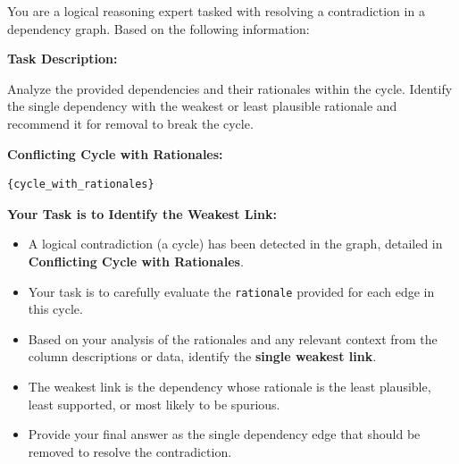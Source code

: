 \begin{tcolorbox}[
    float*=t, width=\textwidth, floatplacement=htbp,
    colback=green!10!white,  %
    colframe=green!60!black, %
    title={Prompt for Cycle Resolution in Dependency Discovery ($\pi_\mathtt{resolve}$)}, %
    fonttitle=\bfseries\color{white}, %
    arc=2mm, %
    boxrule=1pt %
]
\small %

You are a logical reasoning expert tasked with resolving a contradiction in a dependency graph. Based on the following information:

\vspace{\medskipamount} %

\textbf{Task Description:}

Analyze the provided dependencies and their rationales within the cycle. Identify the 
single dependency with the weakest or least plausible rationale and recommend it for 
removal to break the cycle.

\vspace{\medskipamount} %

\textbf{Conflicting Cycle with Rationales:}
\begin{verbatim}
{cycle_with_rationales}
\end{verbatim}
\vspace{\medskipamount} 

\textbf{Your Task is to Identify the Weakest Link:}
\begin{itemize}[leftmargin=*, itemsep=2pt]
    \item A logical contradiction (a cycle) has been detected in the graph, detailed in \textbf{Conflicting Cycle with Rationales}.
    \item Your task is to carefully evaluate the \texttt{rationale} provided for each edge in this cycle.
    \item Based on your analysis of the rationales and any relevant context from the column descriptions or data, identify the \textbf{single weakest link}.
    \item The weakest link is the dependency whose rationale is the least plausible, least supported, or most likely to be spurious.
    \item Provide your final answer as the single dependency edge that should be removed to resolve the contradiction.
\end{itemize}

\label{prompt:resolve}
\end{tcolorbox}

